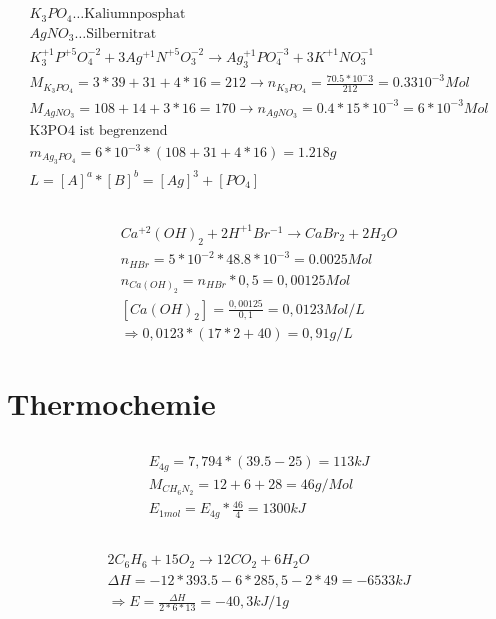 \documentclass[a4paper]{article}
\begin{document}
\subsection{}
\begin{align}
  K_3PO_4 \dots \text{Kaliumnposphat}\\
  AgNO_3 \dots \text{Silbernitrat}\\
  K_3^{+1}P^{+5}O_4^{-2} + 3 Ag^{+1}N^{+5}O_3^{-2} \rightarrow Ag_3^{+1}PO_4^{-3} + 3 K^{+1}NO_3^{-1}\\
  M_{K_3PO_4}=3*39+31+4*16=212 \rightarrow n_{K_3PO_4}=\frac{70.5*10^-3}{212}=0.33 10^{-3}Mol\\
  M_{AgNO_3}=108+14+3*16=170 \rightarrow n_{AgNO_3}=0.4*15*10^{-3}=6*10^{-3}Mol\\
  \text{K3PO4 ist begrenzend}\\
  m_{Ag_3PO_4}=6*10^{-3}*(108+31+4*16)=1.218g\\
  L = [A]^a*[B]^b = [Ag]^3+[PO_4] 
\end{align}

\subsection{}
\begin{align}
  Ca^{+2}(OH)_2 + 2 H^{+1}Br^{-1} \rightarrow CaBr_2 + 2 H_2O\\
  n_{HBr}=5*10^{-2}*48.8*10^{-3}= 0.0025Mol\\  
  n_{Ca(OH)_2}=n_{HBr}*0,5 = 0,00125 Mol\\
  [Ca(OH)_2]=\frac{0,00125}{0,1}=0,0123 Mol/L\\
  \Rightarrow 0,0123*(17*2+40)=0,91 g/L
\end{align}

\section{Thermochemie}
\subsection{}
\begin{align}
  E_{4g}=7,794*(39.5-25)= 113 kJ\\
  M_{CH_6N_2}=12+6+28=46g/Mol\\
  E_{1mol}=E_{4g}*\frac{46}{4}=1300 kJ
\end{align}

\subsection{}
\begin{align}
  2 C_6H_6 + 15 O_2 \rightarrow 12 CO_2 + 6 H_2O\\
  \Delta H = -12*393.5 - 6*285,5 - 2*49 = -6533 kJ\\
  \Rightarrow E = \frac{\Delta H}{2*6*13}=-40,3 kJ/1g
\end{align}
\end{document}
